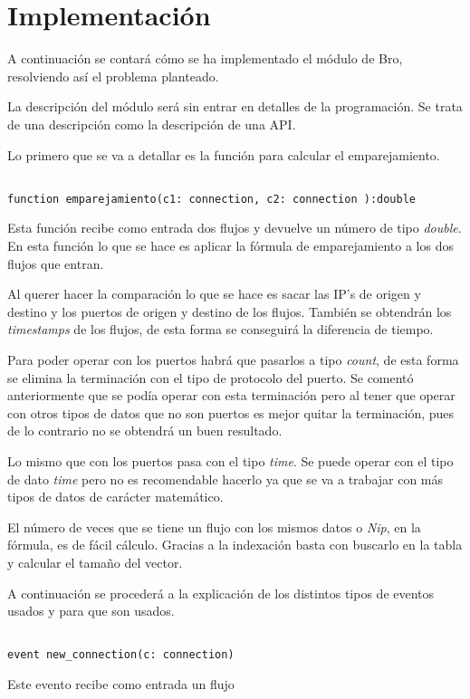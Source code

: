 \chapter{Implementación}

A continuación se contará cómo se ha implementado el módulo de Bro, resolviendo así el problema planteado.

\intro La descripción del módulo será sin entrar en detalles de la programación. Se trata de una descripción 
como la descripción de una API.

\intro Lo primero que se va a detallar es la función para calcular el emparejamiento.

\begin{lstlisting}[style=CodigoC]

function emparejamiento(c1: connection, c2: connection ):double 

\end{lstlisting}

\intro Esta función recibe como entrada dos flujos y devuelve un número de tipo \textit{double}. En esta función 
lo que se hace es aplicar la fórmula de emparejamiento a los dos flujos que entran.

\intro Al querer hacer la comparación lo que se hace es sacar las IP's de origen y destino y los puertos de 
origen y destino de los flujos. También se obtendrán los \textit{timestamps} de los flujos, de esta forma se 
conseguirá la diferencia de tiempo. 

\intro Para poder operar con los puertos habrá que pasarlos a tipo \textit{count}, de esta forma se elimina la 
terminación con el tipo de protocolo del puerto. Se comentó anteriormente que se podía operar con esta terminación 
pero al tener que operar con otros tipos de datos que no son puertos es mejor quitar la terminación, pues de lo 
contrario no se obtendrá un buen resultado. 

\intro Lo mismo que con los puertos pasa con el tipo \textit{time}. Se puede operar con el tipo de dato 
\textit{time} pero no es recomendable hacerlo ya que se va a trabajar con más tipos de datos de carácter 
matemático.

\intro El número de veces que se tiene un flujo con los mismos datos o \textit{Nip}, en la fórmula, es de fácil 
cálculo. Gracias a la indexación basta con buscarlo en la tabla y calcular el tamaño del vector. 

\intro A continuación se procederá a la explicación de los distintos tipos de eventos usados y para que son usados.

\begin{lstlisting}[style=CodigoC]

event new_connection(c: connection)

\end{lstlisting}

\intro Este evento recibe como entrada un flujo







